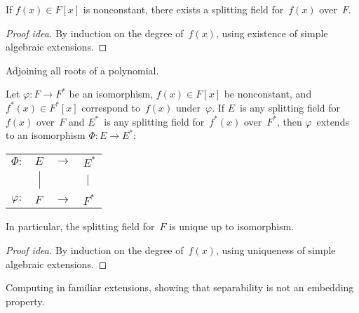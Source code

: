 \begin{thm}
If \(f(x)\in F[x]\) is nonconstant, there exists a splitting field for~\(f(x)\) over~\(F\).
\end{thm}
\begin{proof}[Proof idea]
By induction on the degree of~\(f(x)\), using existence of simple algebraic extensions.
\end{proof}
\begin{app}
Adjoining all roots of a polynomial.
\end{app}

\begin{thm}
Let \(\varphi:F\to F^*\) be an isomorphism, \(f(x)\in F[x]\) be nonconstant, and \(f^*(x)\in F^*[x]\) correspond to~\(f(x)\) under~\(\varphi\). If \(E\)~is any splitting field for~\(f(x)\) over~\(F\) and \(E^*\)~is any splitting field for~\(f^*(x)\) over~\(F^*\), then \(\varphi\)~extends to an isomorphism \(\Phi:E\to E^*\):
\begin{center}
\begin{tabular}{rlll}
\(\Phi:\)&\(E\)&\(\longrightarrow\)&\(E^*\)\\
&\(\;\Bigl|\)&&\(\;\Bigr|\)\\
\(\varphi:\)&\(F\)&\(\longrightarrow\)&\(F^*\)
\end{tabular}
\end{center}
In particular, the splitting field for~\(F\) is unique up to isomorphism.
\end{thm}
\begin{proof}[Proof idea]
By induction on the degree of~\(f(x)\), using uniqueness of simple algebraic extensions.
\end{proof}
\begin{app}
Computing in familiar extensions, showing that separability is not an embedding property.
\end{app}

